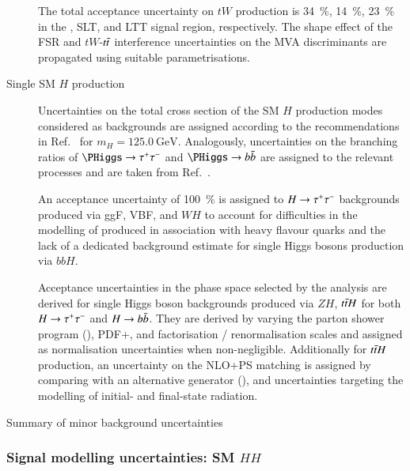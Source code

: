 \begin{description}
  The total acceptance uncertainty on $tW$ production is
  \SI{34}{\percent}, \SI{14}{\percent}, \SI{23}{\percent} in the
  \hadhad, \lephad SLT, and \lephad LTT signal region,
  respectively. The shape effect of the FSR and $tW$-$t\bar{t}$
  interference uncertainties on the MVA discriminants are propagated
  using suitable parametrisations.

\item[Single SM $H$ production] Uncertainties on the total cross
  section of the SM $H$ production modes considered as backgrounds are
  assigned according to the recommendations in
  Ref.~\cite{deFlorian:2016spz} for $m_{H} =
  \SI{125.0}{\GeV}$. Analogously, uncertainties on the branching
  ratios of $\PHiggs \to \tautau$ and $\PHiggs \to \bbbar$ are
  assigned to the relevant processes and are taken from
  Ref.~\cite{deFlorian:2016spz}.

  An acceptance uncertainty of \SI{100}{\percent} is assigned to
  $H \to \tau^{+} \tau^{-}$ backgrounds produced via ggF, VBF, and $WH$ to
  account for difficulties in the modelling of produced in association
  with heavy flavour quarks and the lack of a
  dedicated background estimate for single Higgs bosons production via
  $bbH$.

  Acceptance uncertainties in the phase space selected by the analysis
  are derived for single Higgs boson backgrounds produced via $ZH$,
  $t\bar{t} H$ for both $H \to \tau^{+} \tau^{-}$ and $H \to b\bar{b}$. They are
  derived by varying the parton shower program (\HERWIG[7]),
  PDF+\alphas, and factorisation / renormalisation scales and assigned
  as normalisation uncertainties when non-negligible. Additionally for
  $t\bar{t} H$ production, an uncertainty on the NLO+PS matching is
  assigned by comparing with an alternative generator
  (\MGNLO[v2.6.0]), and uncertainties targeting the modelling of
  initial- and final-state radiation.
\end{description}


\begin{table}[htbp]
  \centering


  \caption{Summary of minor background uncertainties}
\end{table}

\subsubsection{Signal modelling uncertainties: SM $HH$}

